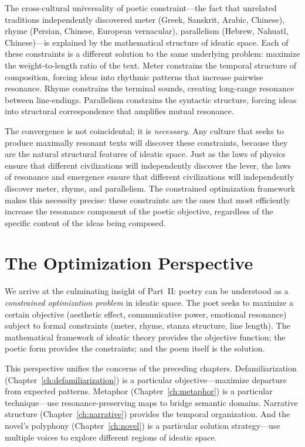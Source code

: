 \begin{remark}
\label{rem:poetic-universals}
The cross-cultural universality of poetic constraint---the fact that unrelated traditions independently discovered meter (Greek, Sanskrit, Arabic, Chinese), rhyme (Persian, Chinese, European vernacular), parallelism (Hebrew, Nahuatl, Chinese)---is explained by the mathematical structure of ideatic space.  Each of these constraints is a different solution to the same underlying problem: maximize the weight-to-length ratio of the text.  Meter constrains the temporal structure of composition, forcing ideas into rhythmic patterns that increase pairwise resonance.  Rhyme constrains the terminal sounds, creating long-range resonance between line-endings.  Parallelism constrains the syntactic structure, forcing ideas into structural correspondence that amplifies mutual resonance.

The convergence is not coincidental; it is \emph{necessary}.  Any culture that seeks to produce maximally resonant texts will discover these constraints, because they are the natural structural features of ideatic space.  Just as the laws of physics ensure that different civilizations will independently discover the lever, the laws of resonance and emergence ensure that different civilizations will independently discover meter, rhyme, and parallelism.  The constrained optimization framework makes this necessity precise: these constraints are the ones that most efficiently increase the resonance component of the poetic objective, regardless of the specific content of the ideas being composed.
\end{remark}

\section{The Optimization Perspective}

We arrive at the culminating insight of Part~II: poetry can be understood as a
\emph{constrained optimization problem} in ideatic space.  The poet seeks to
maximize a certain objective (aesthetic effect, communicative power, emotional
resonance) subject to formal constraints (meter, rhyme, stanza structure, line
length).  The mathematical framework of ideatic theory provides the objective
function; the poetic form provides the constraints; and the poem itself is the
solution.

This perspective unifies the concerns of the preceding chapters.
Defamiliarization (Chapter~\ref{ch:defamiliarization}) is a particular
objective---maximize departure from expected patterns.  Metaphor
(Chapter~\ref{ch:metaphor}) is a particular technique---use resonance-preserving
maps to bridge semantic domains.  Narrative structure
(Chapter~\ref{ch:narrative}) provides the temporal organization.  And the
novel's polyphony (Chapter~\ref{ch:novel}) is a particular solution
strategy---use multiple voices to explore different regions of ideatic space.

